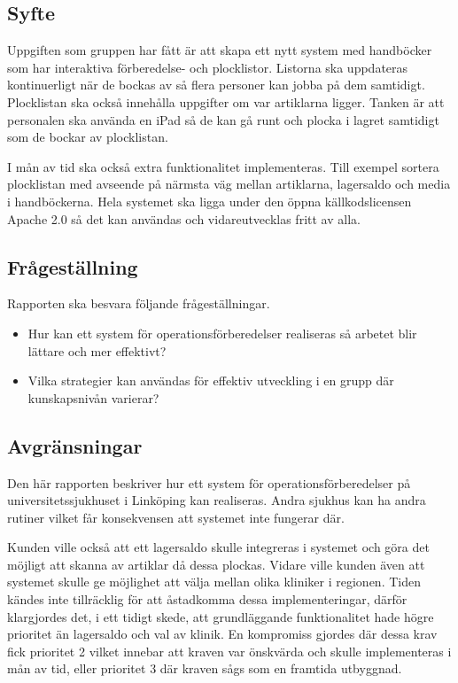 \documentclass{article}
\begin{document}
\subsection{Syfte}
Uppgiften som gruppen har fått är att skapa ett nytt system med handböcker som har interaktiva förberedelse- och plocklistor. Listorna ska uppdateras kontinuerligt när de bockas av så flera personer kan jobba på dem samtidigt. Plocklistan ska också innehålla uppgifter om var artiklarna ligger. Tanken är att personalen 
ska använda en iPad så de kan gå runt och plocka i lagret samtidigt som de bockar av plocklistan.

I mån av tid ska också extra funktionalitet implementeras. Till exempel sortera plocklistan med avseende på närmsta väg mellan artiklarna, lagersaldo och media i handböckerna.
Hela systemet ska ligga under den öppna källkodslicensen Apache 2.0 \cite{apache} så det kan användas och vidareutvecklas fritt av alla.    

\subsection{Frågeställning}
Rapporten ska besvara följande frågeställningar.
\begin{itemize}
\item Hur kan ett system för operationsförberedelser realiseras så arbetet blir lättare och mer effektivt?
\item Vilka strategier kan användas för effektiv utveckling i en grupp där kunskapsnivån varierar? 
\end{itemize}

\subsection{Avgränsningar}
Den här rapporten beskriver hur ett system för operationsförberedelser på universitetssjukhuset i Linköping kan realiseras. Andra sjukhus kan ha andra rutiner vilket får konsekvensen att systemet inte fungerar där.

Kunden ville också att ett lagersaldo skulle integreras i systemet och göra det möjligt att skanna av artiklar då dessa plockas. Vidare ville kunden även att systemet skulle ge möjlighet att välja mellan olika kliniker i regionen. Tiden kändes inte tillräcklig för att åstadkomma dessa implementeringar, därför klargjordes det, i ett tidigt skede, att grundläggande funktionalitet hade högre prioritet än lagersaldo och val av klinik. En kompromiss gjordes där dessa krav fick prioritet 2 vilket innebar att kraven var önskvärda och skulle implementeras i mån av tid, eller prioritet 3 där kraven sågs som en framtida utbyggnad.
\end{document}
